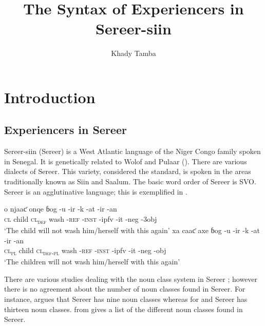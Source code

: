 \documentclass[output=paper]{langscibook}
\author{Khady Tamba\affiliation{Université Cheikh Anta Diop}}
\title{The Syntax of Experiencers in Sereer-siin}
\begin{document}
 
\maketitle 

 

\section{Introduction}
\subsection{Experiencers in Sereer}

Sereer-siin (Sereer) is a West Atlantic language of the Niger Congo family spoken in Senegal. It is genetically  related to Wolof  and Pulaar (\citealt{Simons2017}). There are various dialects of Sereer. This variety, considered the standard, is spoken in the areas traditionally known as Siin and Saalum.  The basic word order of Sereer is SVO. Sereer is an agglutinative language; this is exemplified in .

\ea \label{ex:tamba:1}
\ea
\gll o          njaaƈ   onqe                            ɓog     -u            -ir               {}-k    {}-at  {}-ir    {}-an\\            
    \textsc{cl}  child  \textsc{cl\textsubscript{def}} wash   -\textsc{ref}  -\textsc{inst}    {}-ipfv {}-it  {}-neg   {}-3obj\\
\glt `The child will not wash him/herself with this again'
\ex
\gll xa   caaƈ   axe   ɓog  {}-u  {}-ir       {}-k  {}-at    -ir      {}-an \\
\textsc{cl\textsubscript{pl}}  child  \textsc{cl\textsubscript{def-pl}  } wash   -\textsc{ref}  -\textsc{inst}  {}-ipfv   -it    {}-neg   {}-obj\\
\glt `The children will not wash him/herself with this again'
\z
\z
    
There are various studies dealing with the noun class system in Sereer \cite{Fal1980, Faye1979, Faye2013, Renaudier2012};  however there is no agreement about the number of noun classes found in Sereer. For instance, \citealt{Faye2013} argues that Sereer has nine noun classes whereas for \citet{Fal1980} and \citet{McLaughlin1992} Sereer has thirteen noun classes.  from \citet[284]{McLaughlin1992} gives a list of the different noun classes found in Sereer. 
\end{document}
